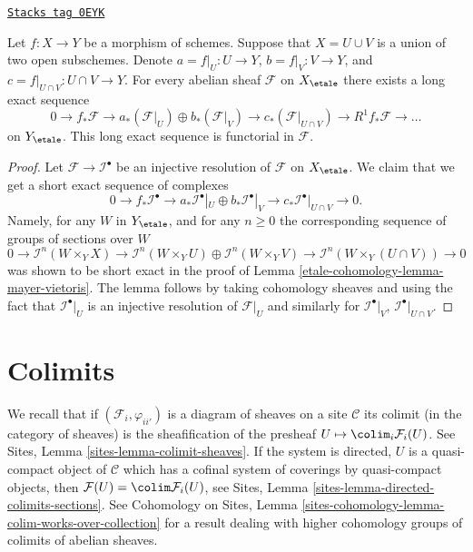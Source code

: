 \begin{lemma}

\label{etale-cohomology-lemma-relative-mayer-vietoris}
\href{https://stacks.math.columbia.edu/tag/0EYK}{\texttt{Stacks tag 0EYK}}

Let $f : X \to Y$ be a morphism of schemes. Suppose that $X = U \cup V$
is a union of two open subschemes. Denote
$a = f|_U : U \to Y$, $b = f|_V : V \to Y$, and
$c = f|_{U \cap V} : U \cap V \to Y$.
For every abelian sheaf $\mathcal{F}$ on $X_\etale$
there exists a long exact sequence
$$
0 \to
f_*\mathcal{F} \to
a_*(\mathcal{F}|_U) \oplus b_*(\mathcal{F}|_V) \to
c_*(\mathcal{F}|_{U \cap V}) \to
R^1f_*\mathcal{F} \to \ldots
$$
on $Y_\etale$.
This long exact sequence is functorial in $\mathcal{F}$.
\end{lemma}

\begin{proof}
Let $\mathcal{F} \to \mathcal{I}^\bullet$ be an injective resolution
of $\mathcal{F}$ on $X_\etale$. We claim that we
get a short exact sequence of complexes
$$
0 \to
f_*\mathcal{I}^\bullet \to
a_*\mathcal{I}^\bullet|_U \oplus b_*\mathcal{I}^\bullet|_V \to
c_*\mathcal{I}^\bullet|_{U \cap V} \to
0.
$$
Namely, for any $W$ in $Y_\etale$, and for any $n \geq 0$ the
corresponding sequence of groups of sections over $W$
$$
0 \to
\mathcal{I}^n(W \times_Y X) \to
\mathcal{I}^n(W \times_Y U)
\oplus \mathcal{I}^n(W \times_Y V) \to
\mathcal{I}^n(W \times_Y (U \cap V)) \to
0
$$
was shown to be short exact in the proof of Lemma \ref{etale-cohomology-lemma-mayer-vietoris}.
The lemma follows by taking cohomology sheaves and using the fact that
$\mathcal{I}^\bullet|_U$ is an injective resolution of $\mathcal{F}|_U$
and similarly for $\mathcal{I}^\bullet|_V$, $\mathcal{I}^\bullet|_{U \cap V}$.
\end{proof}

\section{Colimits}
\label{etale-cohomology-section-colimit}
We recall that if $(\mathcal{F}_i, \varphi_{ii'})$ is a diagram of sheaves on
a site $\mathcal{C}$ its colimit (in the category of sheaves) is the
sheafification of the presheaf $U \mapsto \colim_i \mathcal{F}_i(U)$. See
Sites, Lemma \ref{sites-lemma-colimit-sheaves}.
If the system is directed, $U$ is a quasi-compact object of
$\mathcal{C}$ which has a cofinal system of coverings by quasi-compact
objects, then $\mathcal{F}(U) = \colim \mathcal{F}_i(U)$, see
Sites, Lemma \ref{sites-lemma-directed-colimits-sections}.
See Cohomology on Sites, Lemma
\ref{sites-cohomology-lemma-colim-works-over-collection}
for a result dealing with higher cohomology groups of colimits
of abelian sheaves.

